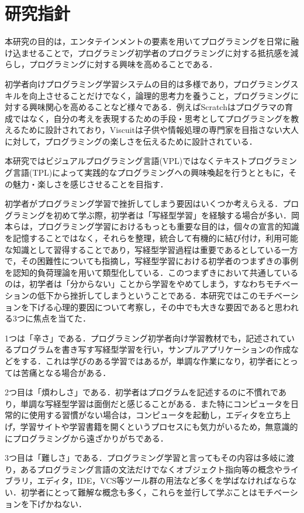 \section{研究指針}

本研究の目的は，エンタテインメントの要素を用いてプログラミングを日常に融け込ませることで，プログラミング初学者のプログラミングに対する抵抗感を減らし，プログラミングに対する興味を高めることである．


初学者向けプログラミング学習システムの目的は多様であり，プログラミングスキルを向上させることだけでなく，論理的思考力を養うこと，プログラミングに対する興味関心を高めることなど様々である．例えばScratchはプログラマの育成ではなく，自分の考えを表現するための手段・思考としてプログラミングを教えるために設計されており，Viscuitは子供や情報処理の専門家を目指さない大人に対して，プログラミングの楽しさを伝えるために設計されている．

本研究ではビジュアルプログラミング言語(VPL)ではなくテキストプログラミング言語(TPL)によって実践的なプログラミングへの興味喚起を行うとともに，その魅力・楽しさを感じさせることを目指す．

初学者がプログラミング学習で挫折してしまう要因はいくつか考えらえる．プログラミングを初めて学ぶ際，初学者は「写経型学習」を経験する場合が多い．岡本らは，プログラミング学習におけるもっとも重要な目的は，個々の宣言的知識を記憶することではなく，それらを整理，統合して有機的に結び付け，利用可能な知識として習得することであり，写経型学習過程は重要であるとしている一方で，その困難性についても指摘し，写経型学習における初学者のつまずきの事例を認知的負荷理論を用いて類型化している\cite{okamoto}．このつまずきにおいて共通しているのは，初学者は「分からない」ことから学習をやめてしまう，すなわちモチベーションの低下から挫折してしまうということである．本研究ではこのモチベーションを下げる心理的要因について考察し，その中でも大きな要因であると思われる3つに焦点を当てた．


1つは「辛さ」である．プログラミング初学者向け学習教材でも，記述されているプログラムを書き写す写経型学習を行い，サンプルアプリケーションの作成などをする．これは学びのある学習ではあるが，単調な作業になり，初学者にとっては苦痛となる場合がある．


2つ目は「煩わしさ」である．初学者はプログラムを記述するのに不慣れであり，単調な写経型学習は面倒だと感じることがある．また特にコンピュータを日常的に使用する習慣がない場合は，コンピュータを起動し，エディタを立ち上げ，学習サイトや学習書籍を開くというプロセスにも気力がいるため，無意識的にプログラミングから遠ざかりがちである．


3つ目は「難しさ」である．プログラミング学習と言ってもその内容は多岐に渡り，あるプログラミング言語の文法だけでなくオブジェクト指向等の概念やライブラリ，エディタ，IDE，VCS等ツール群の用法など多くを学ばなければならない．初学者にとって難解な概念も多く，これらを並行して学ぶことはモチベーションを下げかねない．

